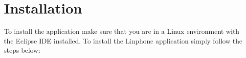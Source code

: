 \documentclass[11pt]{article}
\begin{document}
\newpage
\section{Installation}
To install the application make sure that you are in a Linux environment with the Eclipse IDE installed.
To install the Linphone application simply follow the steps below:
\end{document}
